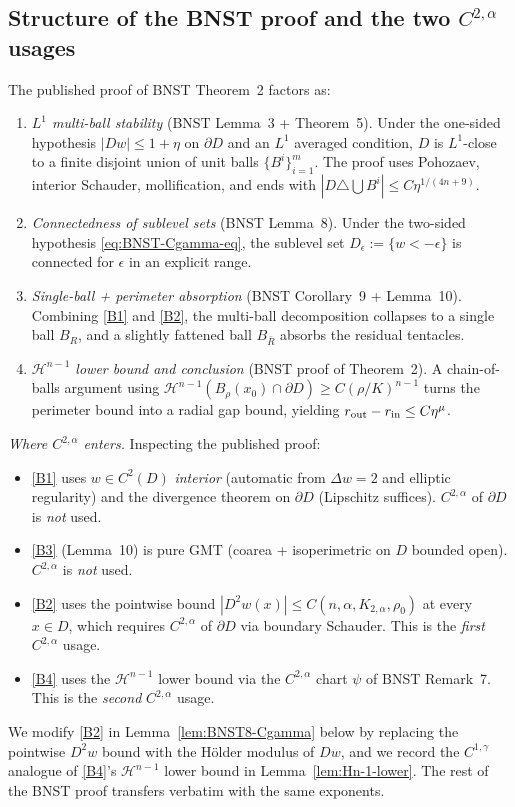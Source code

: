 \documentclass[11pt]{amsart}
\begin{document}
\subsection{Structure of the BNST proof and the two
\texorpdfstring{$C^{2,\alpha}$}{C(2,alpha)} usages}\label{ss:BNST-anatomy}

The published proof of BNST Theorem~2 \cite{BNST} factors as:
\begin{enumerate}[label=\textup{(B\arabic*)}]
\item\label{B1} \emph{$L^1$ multi-ball stability} (BNST Lemma~3 +
Theorem~5).  Under the one-sided hypothesis $|Dw|\le 1+\eta$ on
$\partial D$ and an $L^1$ averaged condition, $D$ is $L^1$-close to a
finite disjoint union of unit balls $\{B^i\}_{i=1}^m$.  The proof
uses Pohozaev, interior Schauder, mollification, and ends with
$|D\triangle\bigcup B^i|\le C\eta^{1/(4n+9)}$.
\item\label{B2} \emph{Connectedness of sublevel sets} (BNST Lemma~8).
Under the two-sided hypothesis \eqref{eq:BNST-Cgamma-eq}, the
sublevel set $D_\epsilon:=\{w<-\epsilon\}$ is connected for
$\epsilon$ in an explicit range.
\item\label{B3} \emph{Single-ball + perimeter absorption} (BNST
Corollary~9 + Lemma~10).  Combining \ref{B1} and \ref{B2}, the
multi-ball decomposition collapses to a single ball $B_R$, and a
slightly fattened ball $B_{\bar R}$ absorbs the residual tentacles.
\item\label{B4} \emph{$\mathcal H^{n-1}$ lower bound and conclusion}
(BNST proof of Theorem~2).  A chain-of-balls argument using
$\mathcal H^{n-1}(B_\rho(x_0)\cap\partial D)\ge C(\rho/K)^{n-1}$
turns the perimeter bound into a radial gap bound, yielding
$r_{\rm out}-r_{\rm in}\le C\eta^{\mu}$.
\end{enumerate}

\emph{Where $C^{2,\alpha}$ enters.}  Inspecting the published proof:
\begin{itemize}
\item \ref{B1} uses $w\in C^2(D)$ \emph{interior} (automatic from
$\Delta w=2$ and elliptic regularity) and the divergence theorem on
$\partial D$ (Lipschitz suffices).  $C^{2,\alpha}$ of $\partial D$ is
\emph{not} used.
\item \ref{B3} (Lemma~10) is pure GMT (coarea + isoperimetric on
$D$ bounded open).  $C^{2,\alpha}$ is \emph{not} used.
\item \ref{B2} uses the pointwise bound $|D^2 w(x)|\le
C(n,\alpha,K_{2,\alpha},\rho_0)$ at every $x\in D$, which requires
$C^{2,\alpha}$ of $\partial D$ via boundary Schauder.  This is the
\emph{first} $C^{2,\alpha}$ usage.
\item \ref{B4} uses the $\mathcal H^{n-1}$ lower bound via the
$C^{2,\alpha}$ chart $\psi$ of BNST Remark~7.  This is the
\emph{second} $C^{2,\alpha}$ usage.
\end{itemize}
We modify \ref{B2} in
Lemma~\ref{lem:BNST8-Cgamma} below by replacing the pointwise
$D^2 w$ bound with the Hölder modulus of $Dw$, and we record the
$C^{1,\gamma}$ analogue of \ref{B4}'s $\mathcal H^{n-1}$ lower bound
in Lemma~\ref{lem:Hn-1-lower}.  The rest of the BNST proof transfers
verbatim with the same exponents.
\end{document}
